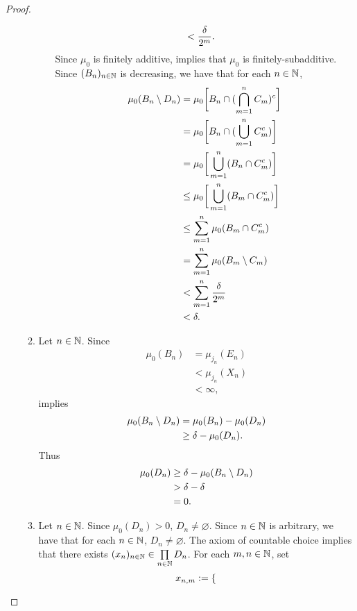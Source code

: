 \documentclass{book}
\begin{document}
\begin{proof}
\begin{enumerate}
\begin{enumerate}
\begin{itemize}
\begin{align*}
					& < \frac{\delta}{2^m}.
				\end{align*}
				Since $\mu_0$ is finitely additive,   implies that $\mu_0$ is finitely-subadditive. Since $(B_n)_{n \in \mathbb{N}}$ is decreasing, we have that for each $n \in \mathbb{N}$,
				\begin{align*}
					\mu_0(B_n \setminus D_n)
					& = \mu_0 \bigg[ B_n \cap (\bigcap\limits_{m=1}^n C_m)^c \bigg] \\
					& = \mu_0 \bigg[ B_n \cap (\bigcup\limits_{m=1}^n C_m^c) \bigg] \\
					& = \mu_0 \bigg[\bigcup\limits_{m=1}^n (B_n \cap C_m^c) \bigg] \\
					& \leq \mu_0 \bigg[\bigcup\limits_{m=1}^n (B_m \cap C_m^c) \bigg] \\
					& \leq \sum_{m=1}^n \mu_0(B_m \cap C_m^c) \\
					& = \sum_{m=1}^n \mu_0(B_m \setminus C_m) \\
					& < \sum_{m=1}^n \frac{\delta}{2^m} \\
					& < \delta.
				\end{align*}
			\end{itemize}
			\item Let $n \in \mathbb{N}$. Since 
			\begin{align*}
				\mu_0(B_n)
				& = \mu_{j_n}(E_n) \\
				& < \mu_{j_n}(X_n) \\
				& < \infty, 
			\end{align*}
			  implies
			\begin{align*}
				\mu_0(B_n \setminus D_n)
				& = \mu_0(B_n) - \mu_0(D_n) \\
				& \geq \delta - \mu_0(D_n). 
			\end{align*}
			Thus 
			\begin{align*}
				\mu_0(D_n)
				& \geq \delta - \mu_0(B_n \setminus D_n) \\
				& > \delta - \delta \\
				& = 0.
			\end{align*}
			\item Let $n \in \mathbb{N}$. Since $\mu_0(D_n) > 0$, $D_n \neq \varnothing$. Since $n \in \mathbb{N}$ is arbitrary, we have that for each $n \in \mathbb{N}$, $D_n \neq \varnothing$. The axiom of countable choice implies that there exists $(x_n)_{n \in \mathbb{N}} \in \prod\limits_{n \in \mathbb{N}} D_n$. For each $m,n \in \mathbb{N}$, set  
			\[
			x_{n,m} 
			\vcentcolon=
			\begin{cases}

\end{cases}\]
\end{enumerate}
\end{enumerate}
\end{proof}
\end{document}
